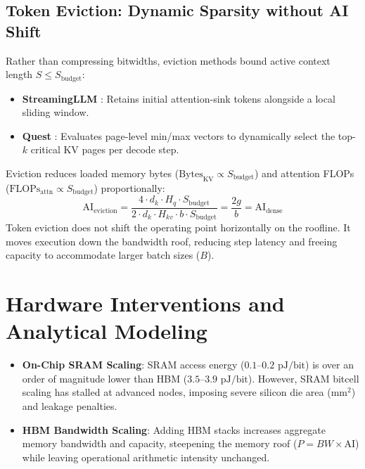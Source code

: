 \documentclass[conference,onecolumn]{IEEEtran}
\begin{document}
\subsection{Token Eviction: Dynamic Sparsity without AI Shift}
Rather than compressing bitwidths, eviction methods bound active context length $S \le S_{\text{budget}}$:
\begin{itemize}
    \item \textbf{StreamingLLM} \cite{xiao2023streamingllm}: Retains initial attention-sink tokens alongside a local sliding window.
    \item \textbf{Quest} \cite{tang2024quest}: Evaluates page-level min/max vectors to dynamically select the top-$k$ critical KV pages per decode step.
\end{itemize}
Eviction reduces loaded memory bytes ($\text{Bytes}_{\text{KV}} \propto S_{\text{budget}}$) and attention FLOPs ($\text{FLOPs}_{\text{attn}} \propto S_{\text{budget}}$) proportionally:
\begin{equation}
\text{AI}_{\text{eviction}} = \frac{4 \cdot d_k \cdot H_q \cdot S_{\text{budget}}}{2 \cdot d_k \cdot H_{kv} \cdot b \cdot S_{\text{budget}}} = \frac{2g}{b} = \text{AI}_{\text{dense}}
\end{equation}
Token eviction does not shift the operating point horizontally on the roofline. It moves execution down the bandwidth roof, reducing step latency and freeing capacity to accommodate larger batch sizes ($B$).

\section{Hardware Interventions and Analytical Modeling}
\begin{itemize}
    \item \textbf{On-Chip SRAM Scaling}: SRAM access energy ($0.1$--$0.2\text{ pJ/bit}$) is over an order of magnitude lower than HBM ($3.5$--$3.9\text{ pJ/bit}$). However, SRAM bitcell scaling has stalled at advanced nodes, imposing severe silicon die area ($\text{mm}^2$) and leakage penalties.
    \item \textbf{HBM Bandwidth Scaling}: Adding HBM stacks increases aggregate memory bandwidth and capacity, steepening the memory roof ($P = BW \times \text{AI}$) while leaving operational arithmetic intensity unchanged.
\end{itemize}
\end{document}
